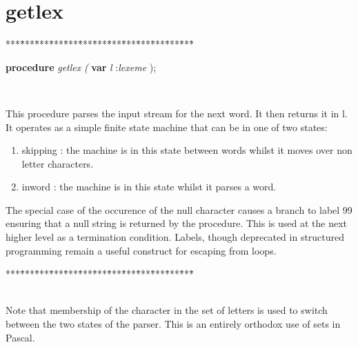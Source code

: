 \documentclass[10pt, a4paper]{article}
\begin{document}
\section{getlex}\label{sec:./uniquewords/loadsetgetlex}

\begin{tabbing}
***\=***\=***\=***\=***\=***\=***\=***\=***\=***\=***\=***\=***\=\kill
\parbox{14cm}{\textsf{\textbf{procedure}  \textit{getlex} \textit{(} \textbf{var}  \textit{l} :\textit{lexeme} );}}\\
\end{tabbing}
This procedure parses the input stream for the next word.
It then returns it in l. It operates as a simple finite
state machine that can be in one of two states:
\begin{enumerate}
\item \textsf{skipping} : the machine is in this state between words
whilst it moves over non letter characters.
\item \textsf{inword} : the machine is in this state whilst it parses
a word.
\end{enumerate}
The special case of the occurence of the null character
causes a branch to label 99 ensuring that a null string
is returned by the procedure. This is used at the
next higher level as a termination condition.
Labels, though deprecated in structured programming remain
a useful construct for escaping from loops.
\begin{tabbing}
***\=***\=***\=***\=***\=***\=***\=***\=***\=***\=***\=***\=***\=\kill
\\
\\
\end{tabbing}
Note that membership of the character in the set of letters
is used to switch between the two states of the parser.
This is an entirely orthodox use of sets in Pascal.
\end{document}
